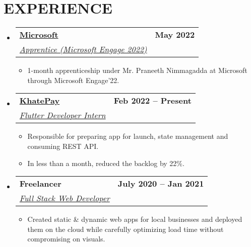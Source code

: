 \documentclass[letterpaper,11pt]{article}
\makeatletter
\newcommand{\resumeItem}[1]{
  \item\small{
    {#1 \vspace{-2pt}}
  }
}
\newcommand{\resumeSubheading}[4]{
  \vspace{-2pt}\item
    \begin{tabular*}{1.0\textwidth}[t]{l@{\extracolsep{\fill}}r}
      \textbf{\large#1} & \textbf{\small #2} \\
      \textit{\large#3} & \textit{\small #4} \\
      
    \end{tabular*}\vspace{-7pt}
}
\newcommand{\resumeSubHeadingListStart}{\begin{itemize}[leftmargin=0.0in, label={}]}
\newcommand{\resumeSubHeadingListEnd}{\end{itemize}}
\newcommand{\resumeItemListStart}{\begin{itemize}}
\newcommand{\resumeItemListEnd}{\end{itemize}\vspace{-5pt}}
\makeatother
\begin{document}
\section{EXPERIENCE}
  \resumeSubHeadingListStart
      \resumeSubheading
      {\href{https://www.microsoft.com}{Microsoft \faExternalLink}}{May 2022} 
      {\underline{Apprentice (Microsoft Engage 2022)}}{}
      \resumeItemListStart
        \resumeItem{\normalsize{1-month apprenticeship under Mr. Praneeth Nimmagadda at Microsoft through Microsoft Engage'22.}}
  
      \resumeItemListEnd
     \resumeSubheading
      {\href{http://khatepay.com}{KhatePay \faExternalLink}}{Feb 2022 -- Present}
      {\underline{Flutter Developer Intern}}{}
      \resumeItemListStart
        \resumeItem{\normalsize{Responsible for preparing app for launch, state management and consuming REST API.}}
        \resumeItem{\normalsize{In less than a month, reduced the backlog by 22\%.}}
  
      \resumeItemListEnd
    \resumeSubheading
      {Freelancer}{July 2020 -- Jan 2021} 
      {\underline{Full Stack Web Developer}}{}
      \resumeItemListStart
        \resumeItem{\normalsize{Created static \& dynamic web apps for local businesses and deployed them on the cloud while carefully optimizing load time without compromising on visuals.}}
  
      \resumeItemListEnd
  \resumeSubHeadingListEnd
\vspace{-12pt}

\end{document}
